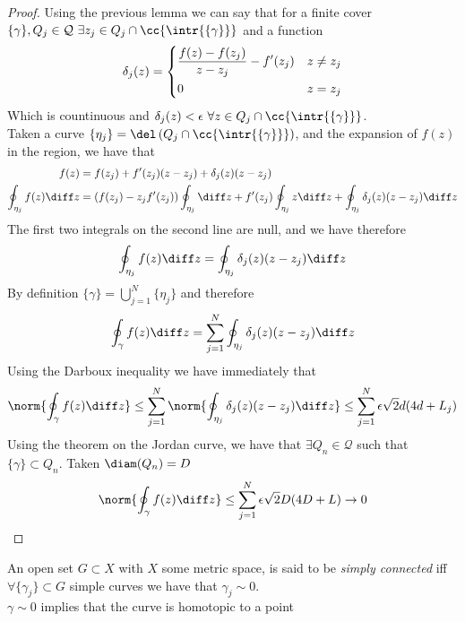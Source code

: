 \documentclass[../mmf.tex]{subfiles}
\begin{document}
\begin{proof}
	Using the previous lemma we can say that for a finite cover $\{\gamma\},Q_j\in\mathcal{Q}\ \exists z_j\in Q_j\cap\cc{\intr{\{\gamma\}}}$ and a function
	\begin{equation*}
		\delta_j(z)=\begin{dcases}\frac{f(z)-f(z_j)}{z-z_j}-f'(z_j)&z\ne z_j\\0&z=z_j\end{dcases}
	\end{equation*}
	Which is countinuous and $\delta_j(z)<\epsilon\ \forall z\in Q_j\cap\cc{\intr{\{\gamma\}}}$.\\
	Taken a curve $\{\eta_j\}=\del\left( Q_j\cap\cc{\intr{\{\gamma\}}} \right)$, and the expansion of $f(z)$ in the region, we have that
	\begin{equation*}
		\begin{aligned}
			f(z)&=f(z_j)+f'(z_j)(z-z_j)+\delta_j(z)(z-z_j)\\
			\oint_{\eta_j}f(z)\diff z&=\left( f(z_j)-z_jf'(z_j) \right)\oint_{\eta_j}\diff z+f'(z_j)\oint_{\eta_j}z\diff z+\oint_{\eta_j}\delta_j(z)(z-z_j)\diff z
		\end{aligned}
	\end{equation*}
	The first two integrals on the second line are null, and we have therefore
	\begin{equation*}
		\oint_{\eta_j}f(z)\diff z=\oint_{\eta_j}\delta_j(z)(z-z_j)\diff z
	\end{equation*}
	By definition $\{\gamma\}=\bigcup_{j=1}^N\{\eta_j\}$ and therefore
	\begin{equation*}
		\oint_{\gamma}f(z)\diff z=\sum_{j=1}^N\oint_{\eta_j}\delta_j(z)(z-z_j)\diff z
	\end{equation*}
	Using the Darboux inequality we have immediately that
	\begin{equation*}
		\norm{\oint_{\gamma}f(z)\diff z}\le\sum_{j=1}^N\norm{\oint_{\eta_j}\delta_j(z)(z-z_j)\diff z}\le\sum_{j=1}^N\epsilon\sqrt{2}d(4d+L_j)
	\end{equation*}
	Using the theorem on the Jordan curve, we have that $\exists Q_n\in\mathcal{Q}$ such that $\{\gamma\}\subset Q_n$. Taken $\diam(Q_n)=D$
	\begin{equation*}
		\norm{\oint_{\gamma}f(z)\diff z}\le\sum_{j=1}^N\epsilon\sqrt{2}D(4D+L)\to0
	\end{equation*}
\end{proof}
\begin{dfn}
	An open set $G\subset X$ with $X$ some metric space, is said to be \textit{simply connected} iff $\forall \{\gamma_j\}\subset G$ simple curves we have that $\gamma_j\sim0$.\\
	$\gamma\sim0$ implies that the curve is homotopic to a point
\end{dfn}
\end{document}
